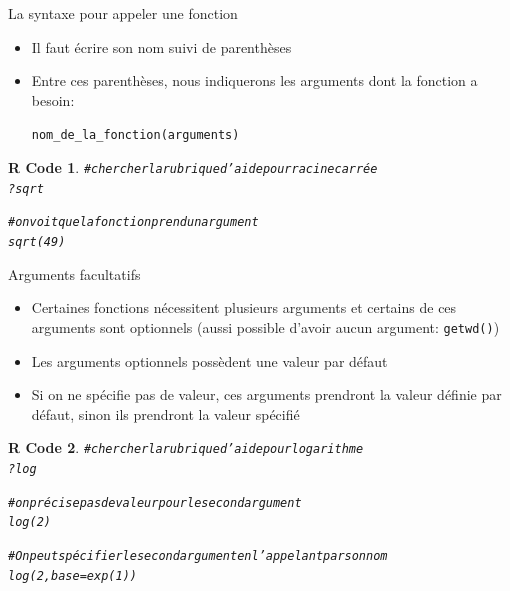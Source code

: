 \documentclass[11pt]{beamer}\usepackage[]{graphicx}\usepackage[]{color}
\makeatletter
\newcommand{\hlnum}[1]{\textcolor[rgb]{0.063,0.58,0.627}{#1}}%
\newcommand{\hlcom}[1]{\textcolor[rgb]{0.588,0.588,0.588}{#1}}%
\newcommand{\hlopt}[1]{\textcolor[rgb]{0.196,0.196,0.196}{#1}}%
\newcommand{\hlstd}[1]{\textcolor[rgb]{0.196,0.196,0.196}{#1}}%
\newcommand{\hlkwc}[1]{\textcolor[rgb]{0,0.631,0.314}{#1}}%
\newcommand{\hlkwd}[1]{\textcolor[rgb]{0.78,0.227,0.412}{#1}}%
\newenvironment{kframe}{%
 \def\at@end@of@kframe{}%
 \ifinner\ifhmode%
  \def\at@end@of@kframe{\end{minipage}}%
  \begin{minipage}{\columnwidth}%
 \fi\fi%
 \def\FrameCommand##1{\hskip\@totalleftmargin \hskip-\fboxsep
 \colorbox{shadecolor}{##1}\hskip-\fboxsep
     \hskip-\linewidth \hskip-\@totalleftmargin \hskip\columnwidth}%
 \MakeFramed {\advance\hsize-\width
   \@totalleftmargin\z@ \linewidth\hsize
   \@setminipage}}%
 {\par\unskip\endMakeFramed%
 \at@end@of@kframe}
\newenvironment{knitrout}{}{} %
\newtheorem{rcode}{R Code}[section]
\newcommand{\code}[1]{\texttt{#1}}
\makeatother
\begin{document}
\begin{frame}[fragile]{La syntaxe pour appeler une fonction}
\begin{itemize}
 \setlength\itemsep{2em}
\item Il faut écrire son nom suivi de parenthèses
\pause \item Entre ces parenthèses, nous indiquerons les arguments dont la fonction a besoin:
\begin{center}
\code{nom\_de\_la\_fonction(arguments)}
\end{center}
\end{itemize}
\pause 
\begin{knitrout}
\color{fgcolor}\begin{kframe}
\begin{rcode}\begin{alltt}
\hlcom{# chercher la rubrique d'aide pour racine carrée}
\hlopt{?}\hlstd{sqrt}

\hlcom{# on voit que la fonction prend un argument}
\hlkwd{sqrt}\hlstd{(}\hlnum{49}\hlstd{)}
\end{alltt}
\end{rcode}\end{kframe}
\end{knitrout}

\end{frame}



\begin{frame}[fragile]{Arguments facultatifs}
\begin{itemize}
 \setlength\itemsep{0.5em}
\item Certaines fonctions nécessitent plusieurs arguments et certains de ces arguments sont optionnels (aussi possible d'avoir aucun argument: \code{getwd()}) 
\pause \item Les arguments optionnels possèdent une valeur par défaut
\pause \item Si on ne spécifie pas de valeur, ces arguments prendront la valeur définie par défaut, sinon ils prendront la valeur spécifié
\end{itemize}
\pause 

\begin{knitrout}\footnotesize
{}\color{fgcolor}\begin{kframe}
\begin{rcode}\begin{alltt}
\hlcom{# chercher la rubrique d'aide pour logarithme}
\hlopt{?}\hlstd{log}

\hlcom{# on précise pas de valeur pour le second argument}
\hlkwd{log}\hlstd{(}\hlnum{2}\hlstd{)}

\hlcom{# On peut spécifier le second argument en l'appelant par son nom}
\hlkwd{log}\hlstd{(}\hlnum{2}\hlstd{,} \hlkwc{base} \hlstd{=} \hlkwd{exp}\hlstd{(}\hlnum{1}\hlstd{))}
\end{alltt}
\end{rcode}\end{kframe}
\end{knitrout}

\end{frame}
\end{document}
